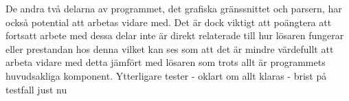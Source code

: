 \newline \newline
De andra två delarna av programmet, det grafiska gränssnittet och parsern, har också potential att arbetas vidare med. Det är dock viktigt att poängtera att fortsatt arbete med dessa delar inte är direkt relaterade till hur lösaren fungerar eller prestandan hos denna vilket kan ses som att det är mindre värdefullt att arbeta vidare med detta jämfört med lösaren som trots allt är programmets huvudsakliga komponent.
\newline \newline
Ytterligare tester - oklart om allt klaras - brist på testfall just nu \newline